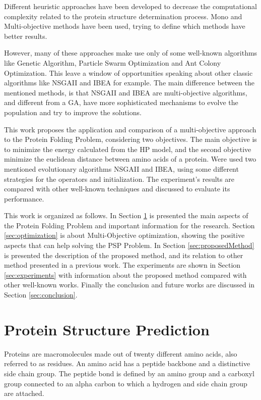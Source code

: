 Different heuristic approaches have been developed to decrease the computational complexity related to the protein structure determination process. Mono and Multi-objective methods have been used, trying to define which methods have better results.

However, many of these approaches make use only of some well-known algorithms like Genetic Algorithm, Particle Swarm Optimization and Ant Colony Optimization. This leave a window of opportunities speaking about other classic algorithms like NSGAII \cite{zitzler1998multiobjective} and IBEA \cite{zitzler2004indicator} for example. The main difference between the mentioned methods, is that NSGAII and IBEA are multi-objective algorithms, and different from a GA, have more sophisticated mechanisms to evolve the population and try to improve the solutions.


This work proposes the application and comparison of a multi-objective approach to the Protein Folding Problem, considering two objectives. The main objective is to minimize the energy calculated from the HP model, and the second objective minimize the euclidean distance between amino acids of a protein. Were used two mentioned evolutionary algorithms NSGAII and IBEA, using some different strategies for the operators and initialization. The experiment's results are compared with other well-known techniques and discussed to evaluate its performance.

This work is organized as follows. In Section \ref{sec:proteinfolding} is presented the main aspects of the Protein Folding Problem and important information for the research. Section \ref{sec:optimization} is about Multi-Objective optimization, showing the positive aspects that can help solving the PSP Problem. In Section \ref{sec:proposedMethod} is presented the description of the proposed method, and its relation to other method presented in a previous work. The experiments are shown in Section \ref{sec:experiments} with information about the proposed method compared with other well-known works. Finally the conclusion and future works are discussed in Section \ref{sec:conclusion}.

\section{Protein Structure Prediction} \label{sec:proteinfolding}


Proteins are macromolecules made out of  twenty different amino acids, also referred to as residues. An amino acid has a peptide backbone and a distinctive side chain group. The peptide bond is defined by an amino group and a carboxyl group connected to an alpha carbon to which  a hydrogen and side chain group are attached.


